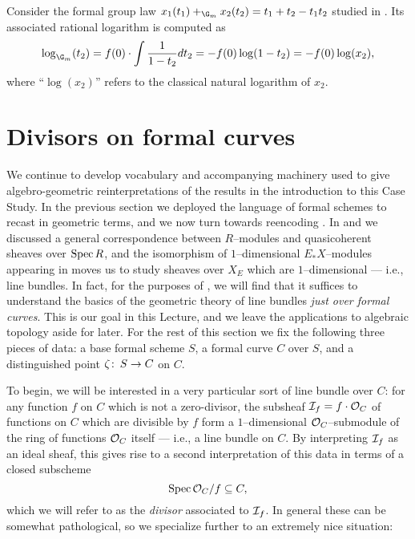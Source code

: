 \begin{example}
Consider the formal group law $x_1(t_1) +_{\G_m} x_2(t_2) = t_1 + t_2 - t_1 t_2$ studied in .  Its associated rational logarithm is computed as \[\log_{\G_m}(t_2) = f(0) \cdot \int \frac{1}{1 - t_2} dt_2 = -f(0) \log(1 - t_2) = -f(0) \log(x_2),\] where ``$\log(x_2)$'' refers to the classical natural logarithm of $x_2$.
\end{example}









\section{Divisors on formal curves}\label{CurveDivisorsSection}

We continue to develop vocabulary and accompanying machinery used to give algebro-geometric reinterpretations of the results in the introduction to this Case Study.  In the previous section we deployed the language of formal schemes to recast  in geometric terms, and we now turn towards reencoding .  In  and  we discussed a general correspondence between $R$--modules and quasicoherent sheaves over $\operatorname{Spec} R$, and the isomorphism of $1$--dimensional $E_* X$--modules appearing in  moves us to study sheaves over $X_E$ which are $1$--dimensional --- i.e., line bundles.  In fact, for the purposes of , we will find that it suffices to understand the basics of the geometric theory of line bundles \emph{just over formal curves}.  This is our goal in this Lecture, and we leave the applications to algebraic topology aside for later.  For the rest of this section we fix the following three pieces of data: a base formal scheme $S$, a formal curve $C$ over $S$, and a distinguished point $\zeta\colon\thinspace S \to C$ on $C$.

To begin, we will be interested in a very particular sort of line bundle over $C$: for any function $f$ on $C$ which is not a zero-divisor, the subsheaf $\mathcal{I}_f = f \cdot \mathcal{O}_C$ of functions on $C$ which are divisible by $f$ form a $1$--dimensional $\mathcal{O}_C$--submodule of the ring of functions $\mathcal{O}_C$ itself --- i.e., a line bundle on $C$.  By interpreting $\mathcal{I}_f$ as an ideal sheaf, this gives rise to a second interpretation of this data in terms of a closed subscheme \[\operatorname{Spec} \mathcal{O}_C / f \subseteq C,\] which we will refer to as the \textit{divisor} associated to $\mathcal{I}_f$.  In general these can be somewhat pathological, so we specialize further to an extremely nice situation:

